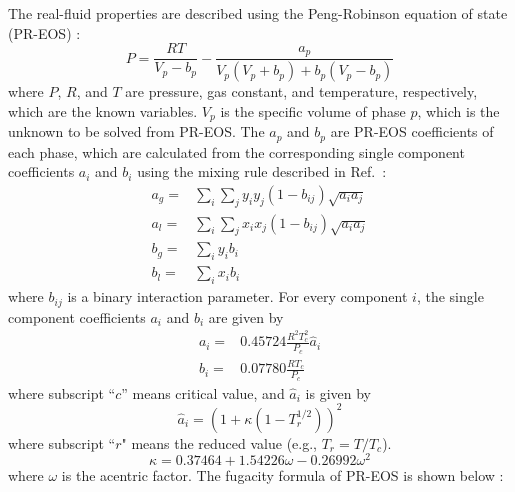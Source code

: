 {    The real-fluid properties are described using the Peng-Robinson equation of state (PR-EOS) \citep{peng1976new}:
    \begin{equation}
        P=\frac{RT}{V_p-b_p}-\frac{a_{p}}{V_p\left(V_{p}+b_p\right)+b_p\left(V_p-b_p\right)} %
        \label{eq:preos}
    \end{equation}
    where $P$, $R$, and $T$ are pressure, gas constant, and temperature, respectively, which are the known variables. $V_p$ is the specific volume of phase $p$, which is the unknown to be solved from PR-EOS. The $a_p$ and $b_p$ are PR-EOS coefficients of each phase, which are calculated from the corresponding single component coefficients $a_i$ and $b_i$ using the mixing rule described in Ref.~\citep{reid1977properties}:
    \begin{align}
        a_g= & \sum_i\sum_jy_iy_j(1-b_{ij})\sqrt{a_ia_j} \label{eq:ap} \\
        a_l= & \sum_i\sum_jx_ix_j(1-b_{ij})\sqrt{a_ia_j}               \\
        b_g= & \sum_iy_i b_i                                           \\
        b_l= & \sum_ix_i b_i \label{eq:bp}
    \end{align}
    where %
    $b_{ij}$ is a binary interaction parameter. For every component $i$, the single component coefficients $a_i$ and $b_i$ are given by
    \begin{align}
        a_i= & 0.45724\frac{R^2 T_c^2}{P_c} \hat{a}_i \label{eq:ai} \\
        b_i= & 0.07780\frac{RT_c}{P_c} \label{eq:bi}
    \end{align}
    where subscript ``$c$'' means critical value, and $\hat{a}_i$ is given by
    \begin{equation}
        \hat{a}_i=(1+\kappa(1-T_r^{1/2}))^2
    \end{equation}
    where subscript ``$r$" means the reduced value (e.g., $T_r=T/T_c$).
    \begin{equation}
        \kappa=0.37464+1.54226\omega-0.26992\omega^2 \label{eq:kappa}
    \end{equation}
    where $\omega$ is the acentric factor. 
    The fugacity formula of PR-EOS is shown below \citep{yi2019multicomponent}:

}
